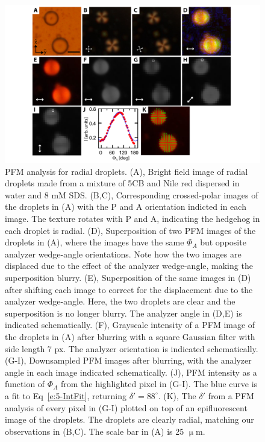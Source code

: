 \begin{figure}
  \centering
  \includegraphics{figures/C5/Ch5-Figs_PFM_Spheres.png}
  \caption{PFM analysis for radial droplets.
  (A), Bright field image of radial droplets made from a mixture of 5CB and Nile red dispersed in water and 8 mM SDS.
  (B,C), Corresponding crossed-polar images of the droplets in (A) with the P and A orientation indicted in each image.
  The texture rotates with P and A, indicating the hedgehog in each droplet is radial.
  (D), Superposition of two PFM images of the droplets in (A), where the images have the same $\Phi_A$ but opposite analyzer wedge-angle orientations. Note how the two images are displaced due to the effect of the analyzer wedge-angle, making the superposition blurry.
  (E), Superposition of the same images in (D) after shifting each image to correct for the displacement due to the analyzer wedge-angle. Here, the two droplets are clear and the superposition is no longer blurry.
  The analyzer angle in (D,E) is indicated schematically.
  (F), Grayscale intensity of a PFM image of the droplets in (A) after blurring with a square Gaussian filter with side length 7 px.
  The analyzer orientation is indicated schematically.
  (G-I), Downsampled PFM images after blurring, with the analyzer angle in each image indicated schematically.
  (J), PFM intensity as a function of $\Phi_A$ from the highlighted pixel in (G-I).
  The blue curve is a fit to Eq~\ref{e:5-IntFit}, returning $\delta' = 88^{\circ}$.
  (K), The $\delta'$ from a PFM analysis of every pixel in (G-I) plotted on top of an epifluorescent image of the droplets.
  The droplets are clearly radial, matching our observations in (B,C).
  The scale bar in (A) is 25 $\upmu$m.}\label{f:5-PFM_Spheres}
\end{figure}

